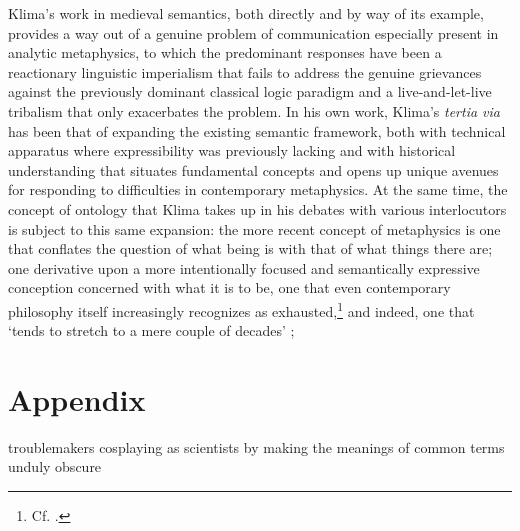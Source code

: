 \documentclass[]{article}
\begin{document}
Klima's work in medieval semantics, 
both directly and by way of its example, 
provides a way out of a genuine problem of communication especially present in analytic metaphysics,
to which the predominant responses have been 
a reactionary linguistic imperialism that fails to address the genuine grievances against the previously dominant classical logic paradigm 
and a live-and-let-live tribalism that only exacerbates the problem. 
In his own work, Klima's \emph{tertia via} has been that of expanding the existing semantic framework, 
both with technical apparatus where expressibility was previously lacking 
and with historical understanding that situates fundamental concepts 
and opens up unique avenues for responding to difficulties in contemporary metaphysics. 
At the same time, 
the concept of ontology that Klima takes up in his debates with various interlocutors is subject to this same expansion: 
the more recent concept of metaphysics is 
one that conflates the question of what being is with that of what things there are;
one derivative upon a more intentionally focused and semantically expressive conception concerned with what it is to be, 
one that even contemporary philosophy itself increasingly recognizes as exhausted,\footnote{Cf. \autocite{Schaffer2009}.}
and indeed, one that `tends to stretch to a mere couple of decades' \autocite[17]{Klima2005}; 

\section{Appendix}


troublemakers cosplaying as scientists by making the meanings of common terms unduly obscure
\end{document}
